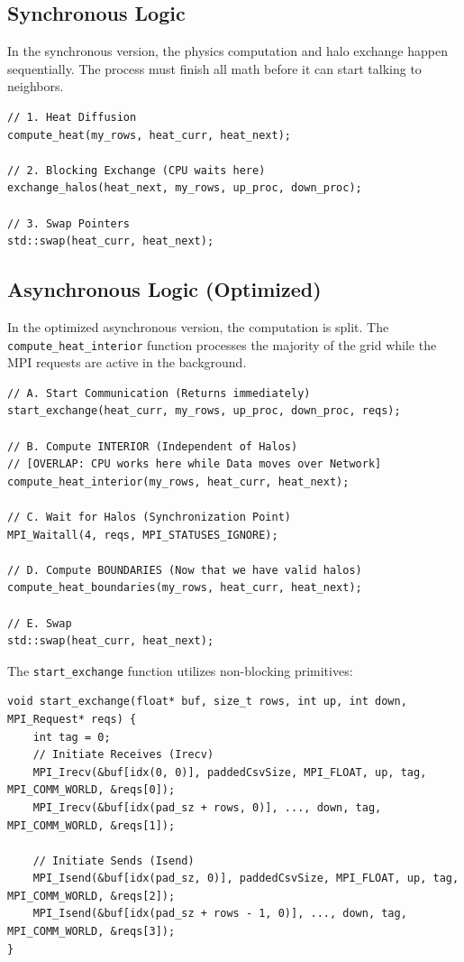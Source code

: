 \documentclass[12pt]{article}
\begin{document}
\subsection{Synchronous Logic}
In the synchronous version, the physics computation and halo exchange happen sequentially. The process must finish all math before it can start talking to neighbors.

\begin{lstlisting}[style=Cpp, caption={Synchronous Halo Exchange using MPI\_Sendrecv}]
// 1. Heat Diffusion
compute_heat(my_rows, heat_curr, heat_next);

// 2. Blocking Exchange (CPU waits here)
exchange_halos(heat_next, my_rows, up_proc, down_proc);

// 3. Swap Pointers
std::swap(heat_curr, heat_next);
\end{lstlisting}

\subsection{Asynchronous Logic (Optimized)}
In the optimized asynchronous version, the computation is split. The \texttt{compute\_heat\_interior} function processes the majority of the grid while the MPI requests are active in the background.

\begin{lstlisting}[style=Cpp, caption={Asynchronous Latency Hiding Pattern}]
// A. Start Communication (Returns immediately)
start_exchange(heat_curr, my_rows, up_proc, down_proc, reqs); 

// B. Compute INTERIOR (Independent of Halos)
// [OVERLAP: CPU works here while Data moves over Network]
compute_heat_interior(my_rows, heat_curr, heat_next);         

// C. Wait for Halos (Synchronization Point)
MPI_Waitall(4, reqs, MPI_STATUSES_IGNORE);                    

// D. Compute BOUNDARIES (Now that we have valid halos)
compute_heat_boundaries(my_rows, heat_curr, heat_next);       

// E. Swap
std::swap(heat_curr, heat_next);
\end{lstlisting}

The \texttt{start\_exchange} function utilizes non-blocking primitives:
\begin{lstlisting}[style=Cpp, caption={Non-blocking MPI Calls}]
void start_exchange(float* buf, size_t rows, int up, int down, MPI_Request* reqs) {
    int tag = 0;
    // Initiate Receives (Irecv)
    MPI_Irecv(&buf[idx(0, 0)], paddedCsvSize, MPI_FLOAT, up, tag, MPI_COMM_WORLD, &reqs[0]);
    MPI_Irecv(&buf[idx(pad_sz + rows, 0)], ..., down, tag, MPI_COMM_WORLD, &reqs[1]);

    // Initiate Sends (Isend)
    MPI_Isend(&buf[idx(pad_sz, 0)], paddedCsvSize, MPI_FLOAT, up, tag, MPI_COMM_WORLD, &reqs[2]);
    MPI_Isend(&buf[idx(pad_sz + rows - 1, 0)], ..., down, tag, MPI_COMM_WORLD, &reqs[3]);
}
\end{lstlisting}
\end{document}
